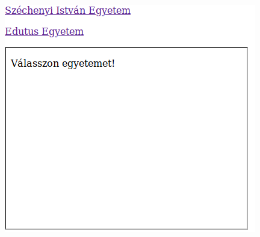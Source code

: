 \begin{frame}
  \begin{columns}[c]
      \begin{exampleblock}{}
        \footnotesize
        
      \end{exampleblock}
      \centering \includegraphics[width=\textwidth]{iframe.png}
  \end{columns}
\end{frame}
